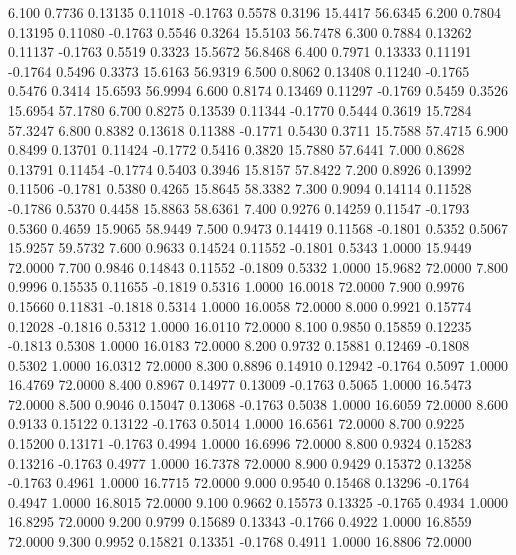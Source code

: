    6.100   0.7736   0.13135   0.11018  -0.1763   0.5578   0.3196  15.4417  56.6345
   6.200   0.7804   0.13195   0.11080  -0.1763   0.5546   0.3264  15.5103  56.7478
   6.300   0.7884   0.13262   0.11137  -0.1763   0.5519   0.3323  15.5672  56.8468
   6.400   0.7971   0.13333   0.11191  -0.1764   0.5496   0.3373  15.6163  56.9319
   6.500   0.8062   0.13408   0.11240  -0.1765   0.5476   0.3414  15.6593  56.9994
   6.600   0.8174   0.13469   0.11297  -0.1769   0.5459   0.3526  15.6954  57.1780
   6.700   0.8275   0.13539   0.11344  -0.1770   0.5444   0.3619  15.7284  57.3247
   6.800   0.8382   0.13618   0.11388  -0.1771   0.5430   0.3711  15.7588  57.4715
   6.900   0.8499   0.13701   0.11424  -0.1772   0.5416   0.3820  15.7880  57.6441
   7.000   0.8628   0.13791   0.11454  -0.1774   0.5403   0.3946  15.8157  57.8422
   7.200   0.8926   0.13992   0.11506  -0.1781   0.5380   0.4265  15.8645  58.3382
   7.300   0.9094   0.14114   0.11528  -0.1786   0.5370   0.4458  15.8863  58.6361
   7.400   0.9276   0.14259   0.11547  -0.1793   0.5360   0.4659  15.9065  58.9449
   7.500   0.9473   0.14419   0.11568  -0.1801   0.5352   0.5067  15.9257  59.5732
   7.600   0.9633   0.14524   0.11552  -0.1801   0.5343   1.0000  15.9449  72.0000
   7.700   0.9846   0.14843   0.11552  -0.1809   0.5332   1.0000  15.9682  72.0000
   7.800   0.9996   0.15535   0.11655  -0.1819   0.5316   1.0000  16.0018  72.0000
   7.900   0.9976   0.15660   0.11831  -0.1818   0.5314   1.0000  16.0058  72.0000
   8.000   0.9921   0.15774   0.12028  -0.1816   0.5312   1.0000  16.0110  72.0000
   8.100   0.9850   0.15859   0.12235  -0.1813   0.5308   1.0000  16.0183  72.0000
   8.200   0.9732   0.15881   0.12469  -0.1808   0.5302   1.0000  16.0312  72.0000
   8.300   0.8896   0.14910   0.12942  -0.1764   0.5097   1.0000  16.4769  72.0000
   8.400   0.8967   0.14977   0.13009  -0.1763   0.5065   1.0000  16.5473  72.0000
   8.500   0.9046   0.15047   0.13068  -0.1763   0.5038   1.0000  16.6059  72.0000
   8.600   0.9133   0.15122   0.13122  -0.1763   0.5014   1.0000  16.6561  72.0000
   8.700   0.9225   0.15200   0.13171  -0.1763   0.4994   1.0000  16.6996  72.0000
   8.800   0.9324   0.15283   0.13216  -0.1763   0.4977   1.0000  16.7378  72.0000
   8.900   0.9429   0.15372   0.13258  -0.1763   0.4961   1.0000  16.7715  72.0000
   9.000   0.9540   0.15468   0.13296  -0.1764   0.4947   1.0000  16.8015  72.0000
   9.100   0.9662   0.15573   0.13325  -0.1765   0.4934   1.0000  16.8295  72.0000
   9.200   0.9799   0.15689   0.13343  -0.1766   0.4922   1.0000  16.8559  72.0000
   9.300   0.9952   0.15821   0.13351  -0.1768   0.4911   1.0000  16.8806  72.0000
